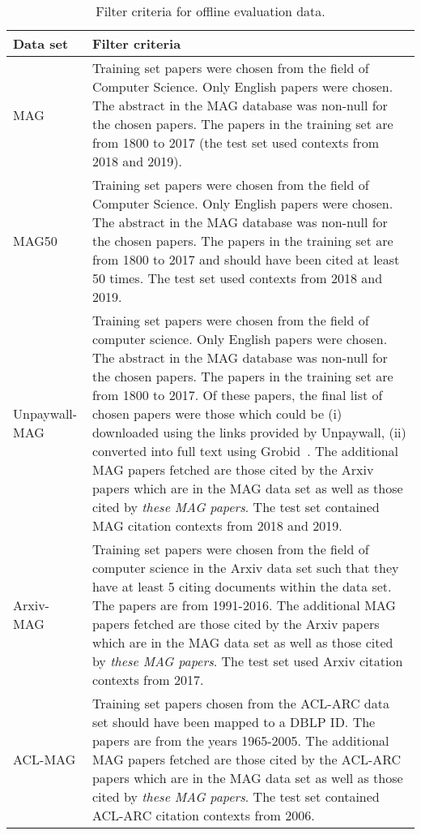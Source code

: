 \begin{table}
\centering
    \caption{Filter criteria for offline evaluation data.}
    \label{tab:datasetfilter}
\begin{center}
    \begin{tabular}{lp{11.5cm}}
    \toprule
    Data set & Filter criteria\\
    \midrule
    MAG & Training set papers were chosen from the field of Computer Science. Only English papers were chosen. The abstract in the MAG database was non-null for the chosen papers. The papers in the training set are from 1800 to 2017 (the test set used contexts from 2018 and 2019).\\
    \midrule
    MAG50 & Training set papers were chosen from the field of Computer Science. Only English papers were chosen. The abstract in the MAG database was non-null for the chosen papers. The papers in the training set are from 1800 to 2017 and should have been cited at least 50 times. The test set used contexts from 2018 and 2019. \\
    \midrule
    Unpaywall-MAG & Training set papers were chosen from the field of computer science. Only English papers were chosen. The abstract in the MAG database was non-null for the chosen papers. The papers in the training set are from 1800 to 2017. Of these papers, the final list of chosen papers were those which could be (i) downloaded using the links provided by Unpaywall, (ii) converted into full text using Grobid~\cite{GROBID}. The additional MAG papers fetched are those cited by the Arxiv papers which are in the MAG data set as well as those cited by \textit{these MAG papers}. The test set contained MAG citation contexts from 2018 and 2019. \\
    \midrule
    Arxiv-MAG & Training set papers were chosen from the field of computer science in the Arxiv data set such that they have at least 5 citing documents within the data set. The papers are from 1991-2016. The additional MAG papers fetched are those cited by the Arxiv papers which are in the MAG data set as well as those cited by \textit{these MAG papers}. The test set used Arxiv citation contexts from 2017.\\
    \midrule
    ACL-MAG & Training set papers chosen from the ACL-ARC data set should have been mapped to a DBLP ID. The papers are from the years 1965-2005. The additional MAG papers fetched are those cited by the ACL-ARC papers which are in the MAG data set as well as those cited by \textit{these MAG papers}. The test set contained ACL-ARC citation contexts from 2006.\\
    \bottomrule
    \end{tabular}
\end{center}
\end{table}

